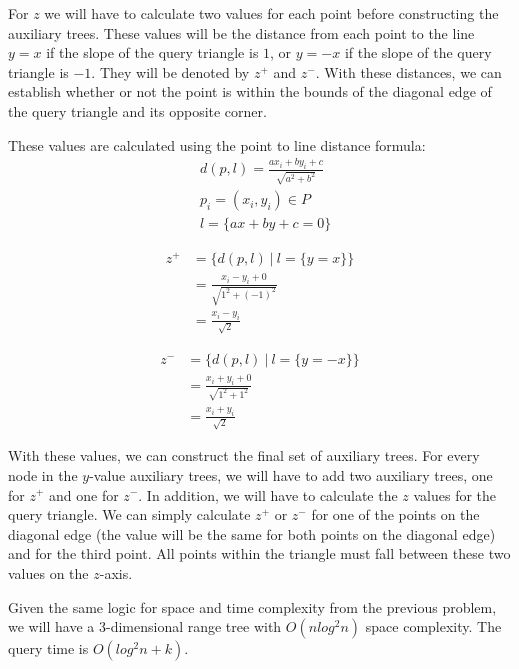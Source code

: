 \documentclass[11pt]{article}
\begin{document}
\begin{enumerate}[(a)]
\begin{solution}
  For \(z\) we will have to calculate two values for each point before constructing the auxiliary trees. These values will be the distance from each point to the line \(y = x\) if the slope of the query triangle is \(1\),
  or \(y = -x\) if the slope of the query triangle is \(-1\). They will be denoted by \(z^+\) and \(z^-\). With these distances, we can establish whether or not the point is within
  the bounds of the diagonal edge of the query triangle and its opposite corner.

  These values are calculated using the point to line distance formula:
  \begin{align*}
    &d(p, l) = \frac{a x_i + b y_i + c}{\sqrt{a^2 + b^2}} \\
    &p_i = (x_i, y_i) \in P \\
    &l = \{ax + by + c = 0\}
  \end{align*}

  \begin{align*}
    z^+ &= \{d(p, l) \ |\ l = \{y = x\}\} \\
    &= \frac{x_i - y_i + 0}{\sqrt{1^2 + (-1)^2}} \\
    &= \frac{x_i - y_i}{\sqrt{2}}
  \end{align*}

  \begin{align*}
    z^- &= \{d(p, l) \ |\ l = \{y = -x\}\} \\
    &= \frac{x_i + y_i + 0}{\sqrt{1^2 + 1^2}} \\
    &= \frac{x_i + y_i}{\sqrt{2}}
  \end{align*}

  With these values, we can construct the final set of auxiliary trees. For every node in the \(y\)-value auxiliary trees, we will have to add two auxiliary trees, one for \(z^+\) and one for \(z^-\).
  In addition, we will have to calculate the \(z\) values for the query triangle. We can simply calculate \(z^+\)
  or \(z^-\) for one of the points on the diagonal edge (the value will be the same for both points on the diagonal edge) and for the third point. All points within the triangle must fall between these two values on the \(z\)-axis.

  Given the same logic for space and time complexity from the previous problem, we will have a 3-dimensional range tree with \(O(n log^2 n)\) space complexity.
  The query time is \(O(log^2 n + k)\).


\end{solution}
\end{enumerate}
\end{document}
